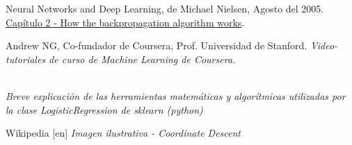 \documentclass[a4paper]{article}
\begin{document}


\pagestyle{fancy}
\lhead{\slshape \leftmark}
\chead{\scalebox{0.1}{asasasa}}
\renewcommand{\headrulewidth}{0.4pt}
\renewcommand{\footrulewidth}{0.4pt}

  \tableofcontents
  \clearpage

  


  

  


  


\clearpage
\begin{thebibliography}{50}

 Neural Networks and Deep Learning, de Michael Nielsen, Agosto del 2005. \href{Capítulo 2}{Capítulo 2 - How the backpropagation algorithm works}.

	Andrew NG, Co-fundador de Coursera, Prof. Universidad de Stanford. \textit{Video-tutoriales de curso de Machine Learning de Coursera.}

	\href{http://scikit-learn.org/stable/modules/linear\char`_model.html\#logistic-regression}  \\ \textit{Breve explicación de las herramientas matemáticas y algorítmicas utilizadas por la clase LogisticRegression de sklearn (python)}

	Wikipedia [en] \textit{Imagen ilustrativa - Coordinate Descent}
\end{thebibliography}
\end{document}
